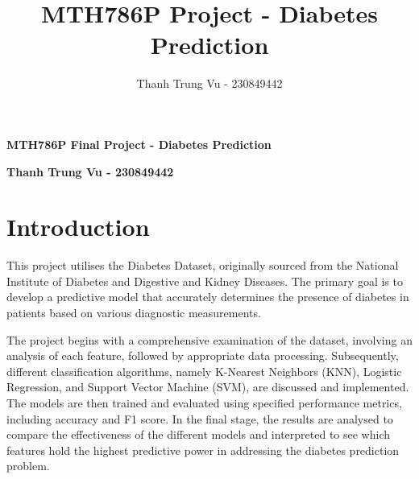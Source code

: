 \documentclass[12pt]{article}
\title{MTH786P Project - Diabetes Prediction}
\author{Thanh Trung Vu - 230849442}
\makeatletter
\renewcommand{\maketitle}{
    {\LARGE \@title \par}      %
    {\large \@author \par}     %
}
\makeatother
\begin{document}
\setlength\parskip{0.5em plus 0.1em minus 0.2em}








{\large \textbf{MTH786P Final Project - Diabetes Prediction}}

{\large \textbf{Thanh Trung Vu - 230849442}}


\section{Introduction}


\indent This project utilises the Diabetes Dataset\cite{kaggle-diabetes}, originally sourced from the National Institute of Diabetes and Digestive and Kidney Diseases. The primary goal is to develop a predictive model that accurately determines the presence of diabetes in patients based on various diagnostic measurements.

The project begins with a comprehensive examination of the dataset, involving an analysis
of each feature, followed by appropriate data processing. Subsequently, different classification
algorithms, namely K-Nearest Neighbors (KNN), Logistic Regression, and Support Vector Machine
(SVM), are discussed and implemented. The models are then trained and evaluated using specified
performance metrics, including accuracy and F1 score. In the final stage, the results are analysed
to compare the effectiveness of the different models and interpreted to see which features hold the highest
predictive power in addressing the diabetes prediction problem.
\end{document}
